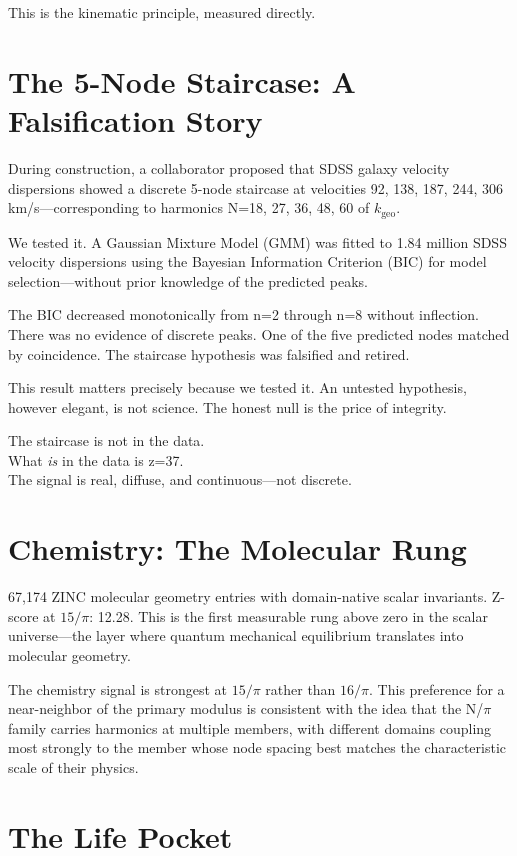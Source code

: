 \documentclass[11pt, letterpaper, openany]{book}
\begin{document}
This is the kinematic principle, measured directly.

\section*{The 5-Node Staircase: A Falsification Story}

During construction, a collaborator proposed that SDSS galaxy velocity dispersions showed a
discrete 5-node staircase at velocities 92, 138, 187, 244, 306 km/s---corresponding to
harmonics N=18, 27, 36, 48, 60 of $k_\text{geo}$.

We tested it. A Gaussian Mixture Model (GMM) was fitted to 1.84 million SDSS velocity
dispersions using the Bayesian Information Criterion (BIC) for model selection---without prior
knowledge of the predicted peaks.

The BIC decreased monotonically from n=2 through n=8 without inflection. There was no
evidence of discrete peaks. One of the five predicted nodes matched by coincidence. The
staircase hypothesis was falsified and retired.

This result matters precisely because we tested it. An untested hypothesis, however elegant,
is not science. The honest null is the price of integrity.

The staircase is not in the data.\\
What \emph{is} in the data is z=37.\\
The signal is real, diffuse, and continuous---not discrete.

\section*{Chemistry: The Molecular Rung}

67,174 ZINC molecular geometry entries with domain-native scalar invariants. Z-score at
$15/\pi$: 12.28. This is the first measurable rung above zero in the scalar universe---the
layer where quantum mechanical equilibrium translates into molecular geometry.

The chemistry signal is strongest at $15/\pi$ rather than $16/\pi$. This preference for a
near-neighbor of the primary modulus is consistent with the idea that the N/$\pi$ family
carries harmonics at multiple members, with different domains coupling most strongly to the
member whose node spacing best matches the characteristic scale of their physics.

\section*{The Life Pocket}
\end{document}
